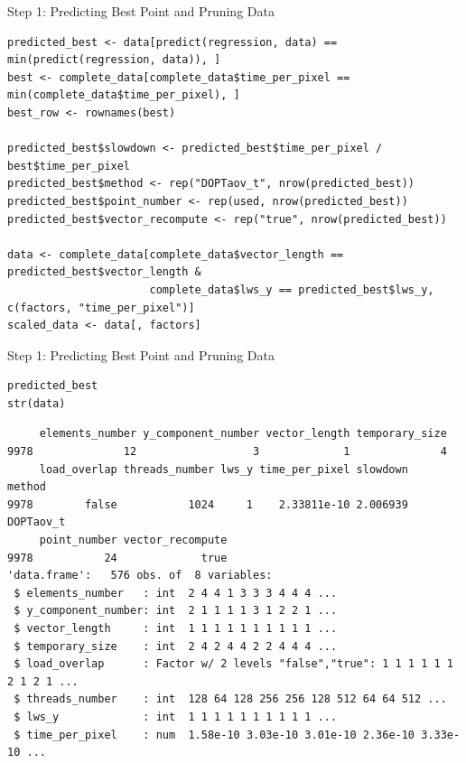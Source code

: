 \documentclass[10pt, compress, aspectratio=169, xcolor={table,usenames,dvipsnames}]{beamer}
\begin{document}
\begin{frame}[fragile,label={sec:org2a3434d}]{Step 1: Predicting Best Point and Pruning Data}
 \lstset{language=r,label= ,caption= ,captionpos=b,numbers=none}
\begin{lstlisting}
predicted_best <- data[predict(regression, data) == min(predict(regression, data)), ]
best <- complete_data[complete_data$time_per_pixel == min(complete_data$time_per_pixel), ]
best_row <- rownames(best)

predicted_best$slowdown <- predicted_best$time_per_pixel / best$time_per_pixel
predicted_best$method <- rep("DOPTaov_t", nrow(predicted_best))
predicted_best$point_number <- rep(used, nrow(predicted_best))
predicted_best$vector_recompute <- rep("true", nrow(predicted_best))

data <- complete_data[complete_data$vector_length == predicted_best$vector_length &
                      complete_data$lws_y == predicted_best$lws_y, c(factors, "time_per_pixel")]
scaled_data <- data[, factors]
\end{lstlisting}
\end{frame}
\begin{frame}[fragile,label={sec:org0977c97}]{Step 1: Predicting Best Point and Pruning Data}
 \scriptsize
\lstset{language=r,label= ,caption= ,captionpos=b,numbers=none}
\begin{lstlisting}
predicted_best
str(data)
\end{lstlisting}

\begin{verbatim}
     elements_number y_component_number vector_length temporary_size
9978              12                  3             1              4
     load_overlap threads_number lws_y time_per_pixel slowdown    method
9978        false           1024     1    2.33811e-10 2.006939 DOPTaov_t
     point_number vector_recompute
9978           24             true
'data.frame':	576 obs. of  8 variables:
 $ elements_number   : int  2 4 4 1 3 3 3 4 4 4 ...
 $ y_component_number: int  2 1 1 1 1 3 1 2 2 1 ...
 $ vector_length     : int  1 1 1 1 1 1 1 1 1 1 ...
 $ temporary_size    : int  2 4 2 4 4 2 2 4 4 4 ...
 $ load_overlap      : Factor w/ 2 levels "false","true": 1 1 1 1 1 1 2 1 2 1 ...
 $ threads_number    : int  128 64 128 256 256 128 512 64 64 512 ...
 $ lws_y             : int  1 1 1 1 1 1 1 1 1 1 ...
 $ time_per_pixel    : num  1.58e-10 3.03e-10 3.01e-10 2.36e-10 3.33e-10 ...
\end{verbatim}
\normalsize
\end{frame}
\end{document}
